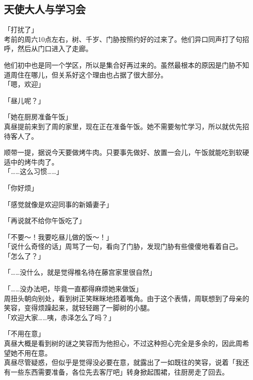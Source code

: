 \subsection{天使大人与学习会}

「打扰了」\\

考前的周六10点左右，树、千岁、门胁按照约好的过来了。他们异口同声打了句招呼，然后从门口进入了走廊。

他们初中也是同一个学区，所以是集合好再过来的。虽然最根本的原因是门胁不知道周住在哪儿，但关系好这个理由也占据了很大部分。\\

「嗯，欢迎」

「昼儿呢？」

「她在厨房准备午饭」\\

真昼提前来到了周的家里，现在正在准备午饭。她不需要匆忙学习，所以就优先招待客人了。

顺带一提，据说今天要做烤牛肉。只要事先做好、放置一会儿，午饭就能吃到软硬适中的烤牛肉了。\\

「……这么习惯……」

「你好烦」

「感觉就像是欢迎同事的新婚妻子」

「再说就不给你午饭吃了」

「不要～！我要吃昼儿做的饭～！」\\

「说什么奇怪的话」周骂了一句，看向了门胁，发现门胁有些傻傻地看着自己。\\

「怎么了？」

「……没什么，就是觉得椎名待在藤宫家里很自然」

「……没办法吧，毕竟一直都得麻烦她来做饭」\\

周扭头朝向别处，看到树正笑眯眯地捂着嘴角。由于这个表情，周联想到了母亲的笑容，变得烦躁起来，就轻轻踢了一脚树的小腿。\\

「欢迎大家……咦，赤泽怎么了吗？」

「不用在意」\\

真昼大概是看到树的谜之笑容而为他担心，不过这种担心完全是多余的，因此周希望她不用在意。\\

真昼尽管疑惑，但似乎是觉得没必要在意，就露出了一如既往的笑容，说着「我还有一些东西需要准备，各位先去客厅吧」转身掀起围裙，往厨房走了回去。

